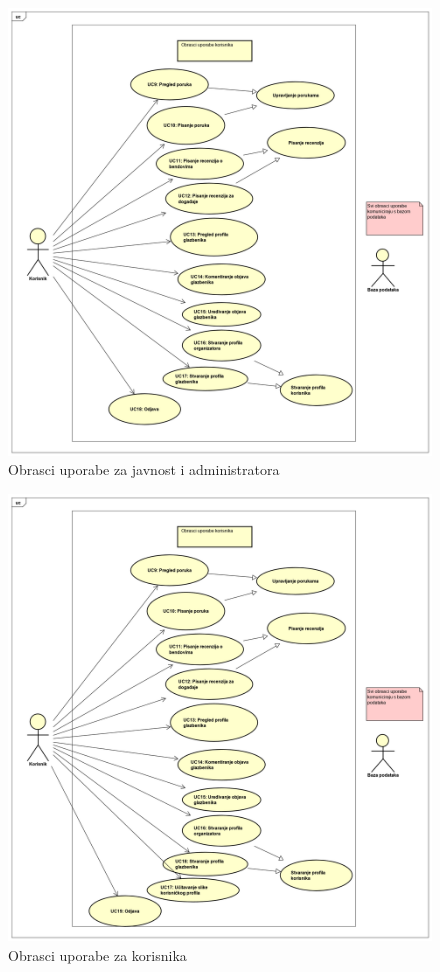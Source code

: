		\begin{figure}[H]
		\begin{center}
			\includegraphics[width=17cm]{slike/javnost_admin2.PNG}
		\end{center}
		\caption{Obrasci uporabe za javnost i administratora}
		\label{fig:ou2}
	\end{figure}

		\begin{figure}[H]
			\begin{center}
				\includegraphics[width=17cm]{slike/korisnik.PNG}
			\end{center}
			\caption{Obrasci uporabe za korisnika}
			\label{fig:ou3}
		\end{figure}
				
